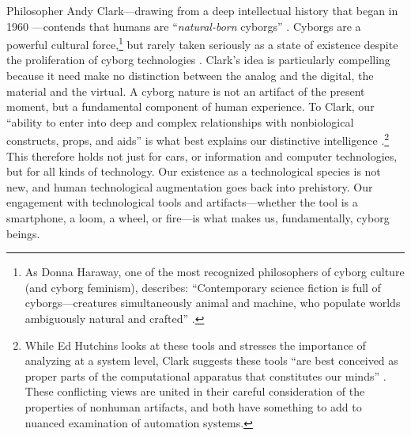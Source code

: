 Philosopher Andy
Clark---drawing from a deep intellectual history that began in 1960 \cite{clyneskline}---contends that humans are ``\emph{natural-born}
cyborgs'' \cite[p. 6]{clarkNBC}. Cyborgs are a powerful cultural
force,\footnote{As Donna Haraway, one of the most recognized
philosophers of cyborg culture (and cyborg feminism), describes:
``Contemporary science 
fiction is full of cyborgs---creatures simultaneously
animal and machine, who populate worlds ambiguously natural and
crafted'' \cite[p. 117]{haraway}.} but rarely taken seriously as a state
of existence despite the proliferation of cyborg technologies \cite[p.
  65]{ekbia}. Clark's idea is particularly compelling
because it need make no distinction between the analog and the
digital, the material and the virtual. A cyborg nature is not an artifact of the
present moment, but a fundamental component of human experience. To
Clark, our ``ability to enter into deep and complex relationships with
nonbiological constructs, props, and aids'' is what best explains our
distinctive intelligence \cite[p. 5]{clarkNBC}.\footnote{While Ed
  Hutchins looks at these tools and stresses the importance of
  analyzing at a system level, Clark suggests these tools ``are best
  conceived as proper parts of the computational apparatus that
  constitutes our minds'' \cite[p. 6]{clarkNBC}. These conflicting views are
  united in their careful consideration of the properties of nonhuman artifacts,
  and both have something to add to nuanced examination of automation
  systems.} This therefore holds 
not just for cars, or information and computer technologies, but for
all kinds of technology. Our existence as a technological species is
not new, and human technological augmentation goes back into
prehistory. Our engagement with technological tools and
artifacts---whether the tool is a smartphone, a loom, a wheel, or
fire---is what makes us, fundamentally, cyborg beings.



